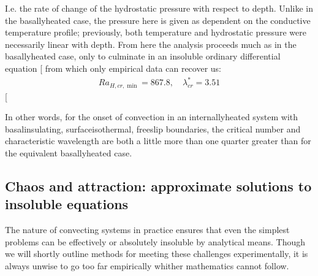 \documentclass[letterpaper,10pt,english]{jupyterBook}
\begin{document}
\sphinxAtStartPar
I.e. the rate of change of the hydrostatic pressure with respect to depth. Unlike in the basally\sphinxhyphen{}heated case, the pressure here is given as dependent on the conductive temperature profile; previously, both temperature and hydrostatic pressure were necessarily linear with depth. From here the analysis proceeds much as in the basally\sphinxhyphen{}heated case, only to culminate in an insoluble ordinary differential equation {[}\sphinxcite{references:id89}{]} from which only empirical data can recover us:
\begin{equation*}
\begin{split} Ra_{H, cr, \min} = 867.8, \quad \lambda_{cr}^* = 3.51 \end{split}
\end{equation*}
\sphinxAtStartPar
{[}\sphinxcite{references:id77}{]}

\sphinxAtStartPar
In other words, for the onset of convection in an internally\sphinxhyphen{}heated system with basal\sphinxhyphen{}insulating, surface\sphinxhyphen{}isothermal, free\sphinxhyphen{}slip boundaries, the critical  number and characteristic wavelength are both a little more than one quarter greater than for the equivalent basally\sphinxhyphen{}heated case.


\subsection{Chaos and attraction: approximate solutions to insoluble equations}
\label{\detokenize{content/chapter_02_methods/section1:chaos-and-attraction-approximate-solutions-to-insoluble-equations}}
\sphinxAtStartPar
The nature of convecting systems in practice ensures that even the simplest problems can be effectively or absolutely insoluble by analytical means. Though we will shortly outline methods for meeting these challenges experimentally, it is always unwise to go too far empirically whither mathematics cannot follow.
\end{document}
